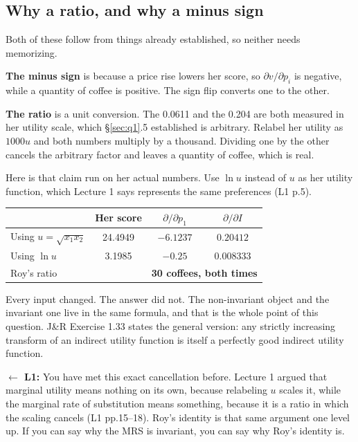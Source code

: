 \documentclass[11pt,letterpaper]{article}
\theoremstyle{definition}
\theoremstyle{plain}
\newcommand{\src}[1]{{\small\textsf{(#1)}}}
\newcommand{\bwd}[1]{\textsf{\textbf{$\leftarrow$ #1:}}}
\begin{document}
\subsection{Why a ratio, and why a minus sign}

Both of these follow from things already established, so neither needs memorizing.

\textbf{The minus sign} is because a price rise lowers her score, so $\partial v / \partial p_i$ is
negative, while a quantity of coffee is positive. The sign flip converts one to the other.

\textbf{The ratio} is a unit conversion. The 0.0611 and the 0.204 are both measured in her utility
scale, which \S\ref{sec:q1}.5 established is arbitrary. Relabel her utility as $1000u$ and both
numbers multiply by a thousand. Dividing one by the other cancels the arbitrary factor and leaves a
quantity of coffee, which is real.

Here is that claim run on her actual numbers. Use $\ln u$ instead of $u$ as her utility function,
which Lecture 1 says represents the same preferences \src{L1 p.5}.

\begin{center}
\begin{tabular}{@{}lccc@{}}
\toprule
 & \textbf{Her score} & $\partial / \partial p_1$ & $\partial / \partial I$ \\
\midrule
Using $u = \sqrt{x_1 x_2}$ & 24.4949 & $-6.1237$ & $0.20412$ \\
Using $\ln u$ & 3.1985 & $-0.25$ & $0.008333$ \\
\midrule
Roy's ratio & & \multicolumn{2}{c}{\textbf{30 coffees, both times}} \\
\bottomrule
\end{tabular}
\end{center}

Every input changed. The answer did not. The non-invariant object and the invariant one live in the
same formula, and that is the whole point of this question. J\&R Exercise 1.33 states the general
version: any strictly increasing transform of an indirect utility function is itself a perfectly good
indirect utility function.

\bwd{L1} You have met this exact cancellation before. Lecture 1 argued that marginal utility means
nothing on its own, because relabeling $u$ scales it, while the marginal rate of substitution means
something, because it is a ratio in which the scaling cancels \src{L1 pp.15--18}. Roy's identity is
that same argument one level up. If you can say why the MRS is invariant, you can say why Roy's
identity is.
\end{document}
